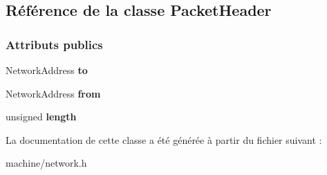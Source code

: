\hypertarget{class_packet_header}{}\subsection{Référence de la classe Packet\+Header}
\label{class_packet_header}
\subsubsection*{Attributs publics}
\begin{DoxyCompactItemize}
\item 
\hypertarget{class_packet_header_a928d5f00dfc8c7ef789b40c7e23482a6}{}\label{class_packet_header_a928d5f00dfc8c7ef789b40c7e23482a6} 
Network\+Address {\bfseries to}
\item 
\hypertarget{class_packet_header_ae385e650d708b1682c5705ce20dbb6c1}{}\label{class_packet_header_ae385e650d708b1682c5705ce20dbb6c1} 
Network\+Address {\bfseries from}
\item 
\hypertarget{class_packet_header_aae6f56002b452b6dc43828fbf1a37699}{}\label{class_packet_header_aae6f56002b452b6dc43828fbf1a37699} 
unsigned {\bfseries length}
\end{DoxyCompactItemize}


La documentation de cette classe a été générée à partir du fichier suivant \+:\begin{DoxyCompactItemize}
\item 
machine/network.\+h\end{DoxyCompactItemize}
